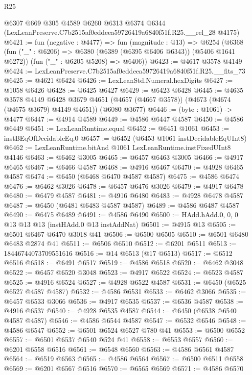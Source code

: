 \begin{lexlean}{R25}
\begin{coremodule}
    @6307
    @669
    @305
    @4589
    @6260
    @6313
    @6374
    @6344
    (LexLeanPreserve.C7b2515af0eddeea59726419a6840f51f.R25.__rel_28 @4175)
@6421 := fun (negative : @4477) =>
  fun (magnitude : @13) =>
  @6254
    (@6368
      (fun ("_" : @6206) => @6380 (@6389 (@6395 @6406 @6343)) (@5406 @1641 @6272))
      (fun ("_" : @6205 @5208) => @6406))
@6423 := @4617 @3578 @4149
@6424 := LexLeanPreserve.C7b2515af0eddeea59726419a6840f51f.R25.__fits_73
@6425 := @4621 @6424
@6426 := LexLeanStd.Numeral.hexDigits
@6427 := @1058 @6426
@6428 := @6425 @6427
@6429 := @6423 @6428
@6445 := @4635
    @3578
    @4149
    @6428
    @3679
    @4651
    (@4657 (@4667 @3578))
    (@4673 (@4674 (@4675 @3679) @4149 @4651))
    (@6080 @3677)
@6446 := (byte : @1061) -> @4477
@6447 := @4914 @4589
@6449 := @4586 @6447 @4587
@6450 := @4586 @6449
@6451 := LexLeanRuntime.equal
@6452 := @6451 @1061
@6453 := instBEqOfDecidableEq.{0}
@6457 := @6452 (@6453 @1061 instDecidableEqUInt8)
@6462 := LexLeanRuntime.bitAnd @1061 LexLeanRuntime.instFixedUInt8 @4146
@6463 := @6462 @3005
@6465 := @6457 @6463 @3005
@6466 := @4917 @6465
@6467 := @6466 @4587
@6468 := @4916 @6467
@6470 := @4928 @6465 @4587
@6474 := @6450 (@6468 @6470 @4587 @4587)
@6475 := @4586 @6474
@6476 := @6462 @3026
@6478 := @6457 @6476 @3026
@6479 := @4917 @6478
@6480 := @6479 @4587
@6481 := @4916 @6480
@6483 := @4928 @6478 @4587
@6487 := @6450 (@6481 @6483 @4587 @4587)
@6489 := @4586 @6487 @4587
@6490 := @6475 @6489
@6491 := @4586 @6490
@6500 := HAdd.hAdd.{0, 0, 0} @13 @13 @13 (instHAdd.{0} @13 instAddNat)
@6501 := @4915 @13
@6505 := @6501 @6467 @6470 @3018 @41
@6506 := @6500 @6505
@6510 := @6501 @6480 @6483 @2874 @41
@6511 := @6506 @6510
@6512 := @6201 @6511
@6513 := 18446744073709551616
@6516 := @14 @6513 (@17 @6513)
@6517 := @6512 @6516
@6518 := @6491 @6517
@6519 := @4586 @6518
@6520 := @6462 @3048
@6522 := @6457 @6520 @3048
@6523 := @4917 @6522
@6524 := @6523 @4587
@6525 := @4916 @6524
@6527 := @4928 @6522 @4587
@6531 := @6450 (@6525 @6527 @4587 @4587)
@6532 := @4586 @6531
@6533 := @6462 @3066
@6535 := @6457 @6533 @3066
@6536 := @4917 @6535
@6537 := @6536 @4587
@6538 := @4916 @6537
@6540 := @4928 @6535 @4587
@6544 := @6450 (@6538 @6540 @4587 @4587)
@6546 := @4586 @6544 @4587
@6547 := @6532 @6546
@6548 := @4586 @6547
@6552 := @6501 @6524 @6527 @780 @41
@6553 := @6500 @6552
@6557 := @6501 @6537 @6540 @524 @41
@6558 := @6553 @6557
@6560 := @6201 @6558 @6516
@6561 := @6548 @6560
@6563 := @4586 @6561 @4587
@6564 := @6519 @6563
@6565 := @4586 @6564
@6567 := @6500 @6511 @6558
@6569 := @6201 @6567 @6516
@6570 := @6565 @6569
@6571 := @4586 @6570

\end{coremodule}
\end{lexlean}

